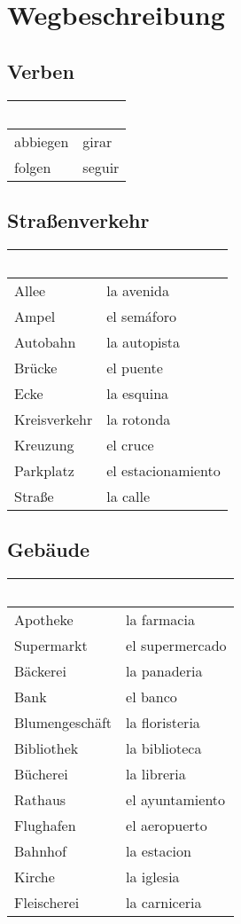 \documentclass{spanish_summary}
\begin{document}
  \section*{Wegbeschreibung}
  \subsection*{Verben}
  \begin{longtable}{p{} | p{}} 
    \textbf{~}     & \textbf{~}                                       \\ \hline
    abbiegen & girar\\
    folgen & seguir\\
  \end{longtable}

  \newpage

  \subsection*{Straßenverkehr}
  \begin{longtable}{p{} | p{}} 
    \textbf{~}     & \textbf{~}                                       \\ \hline
    Allee & la avenida\\
    Ampel & el semáforo \\
    Autobahn & la autopista \\
    Brücke & el puente \\
    Ecke & la esquina\\
    Kreisverkehr & la rotonda\\
    Kreuzung & el cruce \\
    Parkplatz & el estacionamiento\\
    Straße & la calle \\
  \end{longtable}
  
  \subsection*{Gebäude}
  \begin{longtable}{p{} | p{}} 
    \textbf{~}     & \textbf{~}                                       \\ \hline
    Apotheke & la farmacia\\
    Supermarkt & el supermercado\\
    Bäckerei & la panaderia\\
    Bank & el banco\\
    Blumengeschäft & la floristeria\\    
    Bibliothek & la biblioteca\\
    Bücherei & la libreria\\
    Rathaus & el ayuntamiento\\
    Flughafen & el aeropuerto\\
    Bahnhof & la estacion\\
    Kirche & la iglesia\\
    Fleischerei & la carniceria
  \end{longtable}
  
\end{document}
